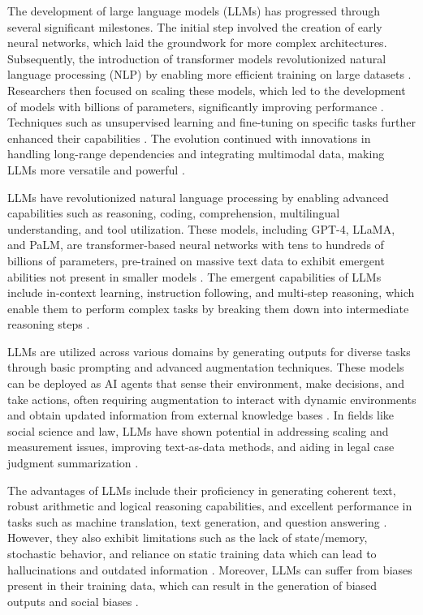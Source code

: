 The development of large language models (LLMs) has progressed through several significant milestones. The initial step involved the creation of early neural networks, which laid the groundwork for more complex architectures. Subsequently, the introduction of transformer models revolutionized natural language processing (NLP) by enabling more efficient training on large datasets \cite{vaswani2017attention}. Researchers then focused on scaling these models, which led to the development of models with billions of parameters, significantly improving performance \cite{brown2020language}. Techniques such as unsupervised learning and fine-tuning on specific tasks further enhanced their capabilities \cite{devlin2018bert}. The evolution continued with innovations in handling long-range dependencies and integrating multimodal data, making LLMs more versatile and powerful \cite{achiam2023gpt, raffel2020exploring}.

\newpage
LLMs have revolutionized natural language processing by enabling advanced capabilities such as reasoning, coding, comprehension, multilingual understanding, and tool utilization. These models, including GPT-4, LLaMA, and PaLM, are transformer-based neural networks with tens to hundreds of billions of parameters, pre-trained on massive text data to exhibit emergent abilities not present in smaller models \cite{xu2024comprehensive}. The emergent capabilities of LLMs include in-context learning, instruction following, and multi-step reasoning, which enable them to perform complex tasks by breaking them down into intermediate reasoning steps \cite{xu2024comprehensive}.

LLMs are utilized across various domains by generating outputs for diverse tasks through basic prompting and advanced augmentation techniques. These models can be deployed as AI agents that sense their environment, make decisions, and take actions, often requiring augmentation to interact with dynamic environments and obtain updated information from external knowledge bases \cite{liu2023explainability}. In fields like social science and law, LLMs have shown potential in addressing scaling and measurement issues, improving text-as-data methods, and aiding in legal case judgment summarization \cite{yang2023evaluating}.

The advantages of LLMs include their proficiency in generating coherent text, robust arithmetic and logical reasoning capabilities, and excellent performance in tasks such as machine translation, text generation, and question answering \cite{yang2023evaluating}. However, they also exhibit limitations such as the lack of state/memory, stochastic behavior, and reliance on static training data which can lead to hallucinations and outdated information \cite{xu2024comprehensive,liu2023explainability}. Moreover, LLMs can suffer from biases present in their training data, which can result in the generation of biased outputs and social biases \cite{zhao2023explainability}.

